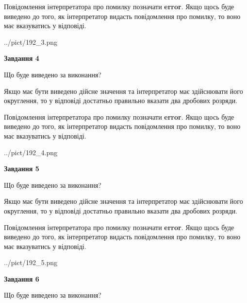 \documentclass[12pt, ukrainian]{article}
\begin{document}
{\begin {Large}
Повідомлення інтерпретатора про помилку позначати \textbf{error}.
Якщо щось буде виведено до того, як інтерпретатор видасть повідомлення про помилку, 
то воно має вказуватись у відповіді. \par

\begin{center}
	{../pict/192_3.png}
\end{center}
\newpage

{\begin {center}\textbf{Завдання 4}\end {center}}\par
Що буде виведено за виконання? \par

Якщо має бути виведено дійсне значення та інтерпретатор має здійснювати його округлення, 
то у відповіді достатньо правильно вказати два дробових розряди.

Повідомлення інтерпретатора про помилку позначати \textbf{error}.
Якщо щось буде виведено до того, як інтерпретатор видасть повідомлення про помилку, 
то воно має вказуватись у відповіді. \par

\begin{center}
	{../pict/192_4.png}
\end{center}
\newpage

{\begin {center}\textbf{Завдання 5}\end {center}}\par
Що буде виведено за виконання? \par

Якщо має бути виведено дійсне значення та інтерпретатор має здійснювати його округлення, 
то у відповіді достатньо правильно вказати два дробових розряди.

Повідомлення інтерпретатора про помилку позначати \textbf{error}.
Якщо щось буде виведено до того, як інтерпретатор видасть повідомлення про помилку, 
то воно має вказуватись у відповіді. \par

\begin{center}
	{../pict/192_5.png}
\end{center}
\newpage

{\begin {center}\textbf{Завдання 6}\end {center}}\par
Що буде виведено за виконання? \par


\end{Large}}
\end{document}
